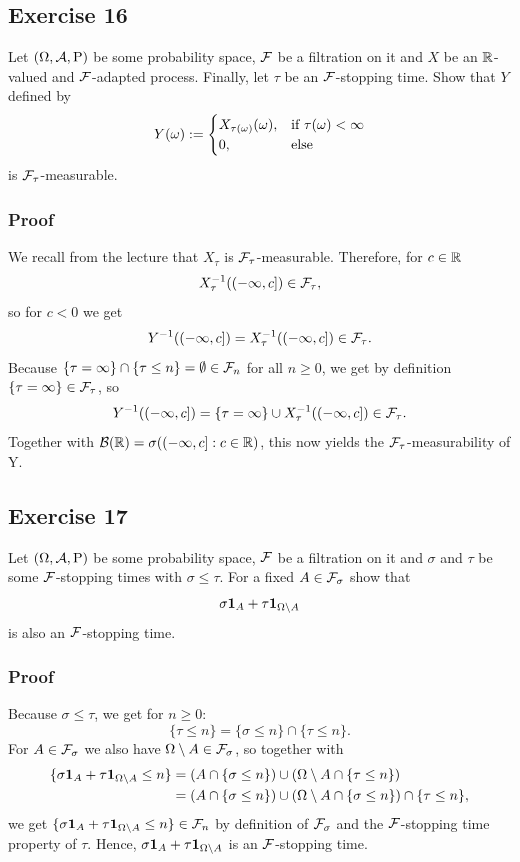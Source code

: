 \documentclass[12pt]{scrartcl}
\date{\today}
\begin{document}
\subsection*{Exercise 16}

Let $(\Omega,\mathcal{A},\text{P})$ be some probability space, $\mathcal{F}$ be a filtration on it and $X$ be an $\mathbb{R}$-valued and $\mathcal{F}$-adapted process. Finally, let $\tau$ be an $\mathcal{F}$-stopping time. Show that $Y$ defined by
$$Y(\omega):=
\begin{cases}
X_{\tau(\omega)}(\omega), & \text{if }\tau(\omega)<\infty \\
0, & \text{else} 
\end{cases}$$
is $\mathcal{F}_{\tau}$-measurable.

\subsubsection*{Proof}
\einruecken

We recall from the lecture that $X_{\tau}$ is $\mathcal{F}_{\tau}$-measurable. Therefore, for $c\in \mathbb{R}$
$$X_{\tau}^{-1}((-\infty,c])\in \mathcal{F}_{\tau},$$
so for $c<0$ we get
$$Y^{-1}((-\infty,c])=X_{\tau}^{-1}((-\infty,c])\in \mathcal{F}_{\tau}.$$
Because $\{\tau=\infty\}\cap\{\tau\le n\}=\emptyset\in\mathcal{F}_n$ for all $n\ge 0$, we get by definition $\{\tau=\infty\}\in\mathcal{F}_{\tau}$, so
$$Y^{-1}((-\infty,c])=\{\tau=\infty\}\cup X_{\tau}^{-1}((-\infty,c])\in \mathcal{F}_{\tau}.$$
Together with $\mathcal{B}(\mathbb{R})=\sigma((-\infty,c]:c\in \mathbb{R})$, this now yields the $\mathcal{F}_{\tau}$-measurability of Y.

\ausruecken

\subsection*{Exercise 17}

Let $(\Omega,\mathcal{A},\text{P})$ be some probability space, $\mathcal{F}$ be a filtration on it and $\sigma$ and $\tau$ be some $\mathcal{F}$-stopping times with $\sigma\le\tau$. For a fixed $A\in\mathcal{F}_{\sigma}$ show that
$$\sigma\textbf{1}_A+\tau\textbf{1}_{\Omega\setminus A}$$
is also an $\mathcal{F}$-stopping time.

\subsubsection*{Proof}
\einruecken

Because $\sigma\le\tau$, we get for $n\ge 0$:
$$\{\tau\le n\}=\{\sigma\le n\}\cap\{\tau\le n\}.$$
For $A\in\mathcal{F}_{\sigma}$ we also have $\Omega\setminus A\in\mathcal{F}_{\sigma}$, so together with
\begin{align*}
\{\sigma\textbf{1}_A + \tau\textbf{1}_{\Omega\setminus A}\le n\}
&= (A\cap\{\sigma\le n\}) \cup (\Omega\setminus A\cap\{\tau\le n\}) \\
&= (A\cap\{\sigma\le n\}) \cup (\Omega\setminus A\cap\{\sigma\le n\})\cap\{\tau\le n\},
\end{align*}
we get $\{\sigma\textbf{1}_A + \tau\textbf{1}_{\Omega\setminus A}\le n\}\in\mathcal{F}_n$ by definition of $\mathcal{F}_{\sigma}$ and the $\mathcal{F}$-stopping time property of $\tau$.
Hence,  $\sigma\textbf{1}_A + \tau\textbf{1}_{\Omega\setminus A}$ is an $\mathcal{F}$-stopping time.
\end{document}
